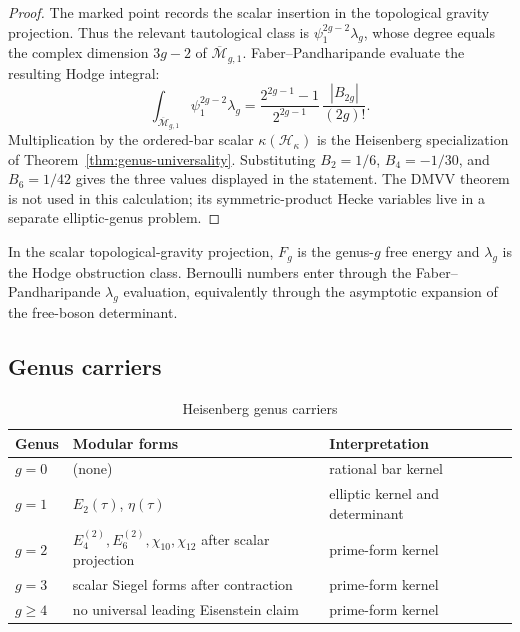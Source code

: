 \begin{proof}
The marked point records the scalar insertion in the topological
gravity projection. Thus the relevant tautological class is
$\psi_1^{2g-2}\lambda_g$, whose degree equals the complex dimension
$3g-2$ of $\overline{\mathcal M}_{g,1}$. Faber--Pandharipande
\cite{FP03} evaluate the resulting Hodge integral:
\[
\int_{\overline{\mathcal M}_{g,1}}\psi_1^{2g-2}\lambda_g
=
\frac{2^{2g-1}-1}{2^{2g-1}}\,
\frac{|B_{2g}|}{(2g)!}.
\]
Multiplication by the ordered-bar scalar $\kappa(\mathcal H_\kappa)$
is the Heisenberg specialization of Theorem~\ref{thm:genus-universality}.
Substituting $B_2=1/6$, $B_4=-1/30$, and $B_6=1/42$ gives the three
values displayed in the statement. The DMVV theorem is not used in
this calculation; its symmetric-product Hecke variables live in a
separate elliptic-genus problem.
\end{proof}

\begin{remark}\label{rem:witten-perspective}
In the scalar topological-gravity projection, $F_g$ is the
genus-$g$ free energy and $\lambda_g$ is the Hodge obstruction class.
Bernoulli numbers enter through the Faber--Pandharipande
$\lambda_g$ evaluation, equivalently through the asymptotic expansion
of the free-boson determinant.
\end{remark}

\subsection{Genus carriers}
\label{subsec:heisenberg-dictionary-complete}

\begin{table}[ht]
\centering
\caption{Heisenberg genus carriers}
\label{tab:heisenberg-complete-dictionary}
\begin{tabular}{|l|l|l|}
\hline
\textbf{Genus} & \textbf{Modular forms} & \textbf{Interpretation} \\
\hline
$g=0$ & (none) & rational bar kernel \\
\hline
$g=1$ & $E_2(\tau)$, $\eta(\tau)$ & elliptic kernel and determinant \\
\hline
$g=2$ & $E_4^{(2)},E_6^{(2)},\chi_{10},\chi_{12}$ after scalar projection & prime-form kernel \\
\hline
$g=3$ & scalar Siegel forms after contraction & prime-form kernel \\
\hline
$g \geq 4$ & no universal leading Eisenstein claim & prime-form kernel \\
\hline
\end{tabular}
\end{table}

